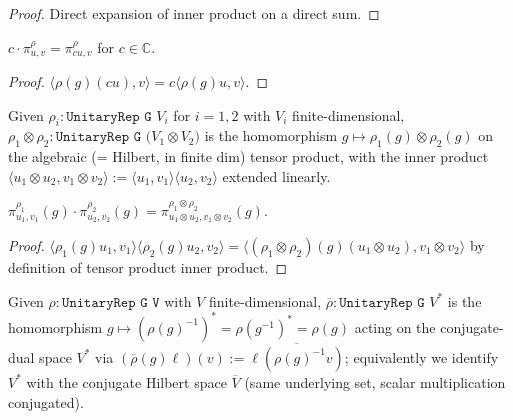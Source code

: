 \begin{proof}
  Direct expansion of inner product on a direct sum.
\end{proof}

\begin{theorem}
  \label{thm:mc-smul}
  \leanok
  $c \cdot \pi_{u,v}^\rho = \pi_{cu, v}^\rho$ for $c \in \mathbb C$.
\end{theorem}

\begin{proof}
  $\langle\rho(g)(c u), v\rangle = c\langle\rho(g)u, v\rangle$.
\end{proof}

\begin{definition}
  \label{def:tensor-rep}
  Given $\rho_i : \texttt{UnitaryRep G $V_i$}$ for $i = 1, 2$ with $V_i$
  finite-dimensional, $\rho_1 \otimes \rho_2 : \texttt{UnitaryRep G ($V_1 \otimes V_2$)}$
  is the homomorphism $g \mapsto \rho_1(g) \otimes \rho_2(g)$ on the
  algebraic (= Hilbert, in finite dim) tensor product, with the inner
  product $\langle u_1\otimes u_2, v_1 \otimes v_2\rangle :=
  \langle u_1, v_1\rangle\langle u_2, v_2\rangle$ extended linearly.
\end{definition}

\begin{theorem}
  \label{thm:mc-mul}
  $\pi_{u_1, v_1}^{\rho_1}(g) \cdot \pi_{u_2, v_2}^{\rho_2}(g) =
   \pi_{u_1 \otimes u_2, v_1 \otimes v_2}^{\rho_1 \otimes \rho_2}(g)$.
\end{theorem}

\begin{proof}
  $\langle\rho_1(g) u_1, v_1\rangle\langle\rho_2(g) u_2, v_2\rangle
   = \langle (\rho_1 \otimes \rho_2)(g)(u_1 \otimes u_2), v_1 \otimes v_2\rangle$
  by definition of tensor product inner product.
\end{proof}

\begin{definition}
  \label{def:contragredient}
  Given $\rho : \texttt{UnitaryRep G V}$ with $V$ finite-dimensional,
  $\overline\rho : \texttt{UnitaryRep G $V^*$}$ is the homomorphism
  $g \mapsto (\rho(g)^{-1})^* = \rho(g^{-1})^* = \rho(g)$ acting on the
  conjugate-dual space $V^*$ via
  $(\overline\rho(g) \ell)(v) := \overline{\ell(\rho(g)^{-1} v)}$;
  equivalently we identify $V^*$ with the conjugate Hilbert space $\overline V$
  (same underlying set, scalar multiplication conjugated).
\end{definition}


